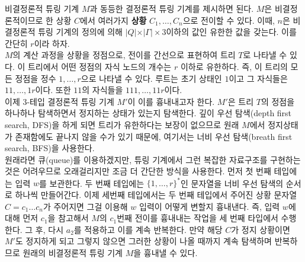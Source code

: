 \documentclass[b5paper, 11pt]{book}
\theoremstyle{definition}
\newenvironment{pf*}{\pushQED{\qed}\pf}
{\popQED\endpf}
\begin{document}
\begin{pf*}
    비결정론적 튜링 기계 $M$과 동등한 결정론적 튜링 기계를 제시하면 된다. $M$은 비결정론적이므로 한 상황 $C$에서 여러가지 \textbf{상황} $C_1, \ldots, C_n$으로 전이할 수 있다. 이때, $n$은 비결정론적 튜링 기계의 정의에 의해 $\vert Q \vert \times \vert \Gamma \vert \times 3$이하의 값인 유한한 값을 갖는다. 이를 간단히 $r$이라 하자. \\ 
    $M$의 계산 과정을 상황을 정점으로, 전이를 간선으로 표현하여 트리 $T$로 나타낼 수 있다. 이 트리에서 어떤 정점의 자식 노드의 개수는 $r$ 이하로 유한하다. 즉, 이 트리의 모든 정점을 정수 $1, \ldots, r$으로 나타낼 수 있다. 루트는 초기 상태인 $1$이고 그 자식들은 $11, \ldots, 1r$이다. 또한 $11$의 자식들을 $111, \ldots, 11r$이다. \\
    이제 3-테입 결정론적 튜링 기계 $M'$이 이를 흉내내고자 한다. $M'$은 트리 $T$의 정점을 하나하나 탐색하면서 정지하는 상태가 있는지 탐색한다. 깊이 우선 탐색(depth first search, DFS)을 하게 되면 트리가 유한하다는 보장이 없으므로 원래 $M$에서 정지상태가 존재함에도 끝나지 않을 수가 있기 때문에, 여기서는 너비 우선 탐색(breath first search, BFS)을 사용한다. \\ 
    원래라면 큐(queue)를 이용하겠지만, 튜링 기계에서 그런 복잡한 자료구조를 구현하는 것은 어려우므로 오래걸리지만 조금 더 간단한 방식을 사용한다. 먼저 첫 번째 테입에는 입력 $w$를 보관한다. 두 번째 테입에는 $\{1, \ldots, r\}^*$인 문자열을 너비 우선 탐색의 순서로 하나씩 만들어간다. 이제 세번째 테입에서는 두 번째 테입에서 주어진 상황 문자열 $C = c_1 \ldots c_n $가 주어지면 그걸 이용해 $w$ 입력이 어떻게 변할지 흉내낸다. 즉, 입력 $w$에 대해 먼저 $c_1$을 참고해서 $M$의 $c_1$번째 전이를 흉내내는 작업을 세 번째 타입에서 수행한다. 그 후, 다시 $a_2$를 적용하고 이를 계속 반복한다. 만약 해당 $C$가 정지 상황이면 $M'$도 정지하게 되고 그렇지 않으면 그러한 상황이 나올 때까지 계속 탐색하며 반복하므로 원래의 비결정론적 튜링 기계 $M$을 흉내낼 수 있다.
\end{pf*}
\end{document}
